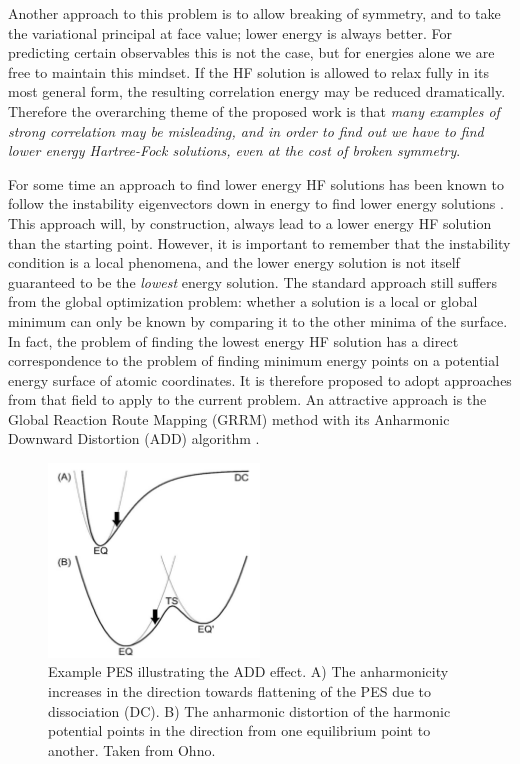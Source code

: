 \documentclass{revtex4}
\begin{document}
    Another approach to this problem is to allow breaking of symmetry, and to take the variational 
    principal at face value; lower 
    energy is 
    always better. For predicting certain observables this is not the case, but for energies alone 
    we are free 
    to maintain this mindset. If the HF solution is allowed to relax fully in its most general 
    form, the resulting correlation energy may be reduced dramatically. Therefore the overarching 
    theme of the proposed work is that 
    \emph{many 
    examples of strong correlation may be misleading, and in order to find out we have to find 
    lower 
    energy Hartree-Fock solutions, even at the cost of broken symmetry}.    
    
    For some time an approach to find lower energy HF solutions has been known to follow the 
    instability eigenvectors down in energy 
    to find lower energy solutions \cite{Seeger1977}. This approach will, by construction, always 
    lead to a lower energy HF solution than the starting point. However, it is important to 
    remember that the instability condition is a local phenomena, and the lower energy solution is 
    not itself guaranteed to be the \emph{lowest} energy solution. The standard approach still 
    suffers 
    from the global optimization problem: whether a solution is a local or global minimum can only 
    be known by comparing it to the other minima of the surface. In fact, the problem of finding 
    the lowest energy HF solution has a direct correspondence to the problem of finding minimum 
    energy points on a potential energy surface of atomic coordinates. It is therefore proposed to 
    adopt approaches from that field to apply to the current problem. An attractive approach is the 
    Global Reaction Route Mapping (GRRM) method with its Anharmonic Downward Distortion (ADD) 
    algorithm \cite{Ohno2006, Ohno2016}. 
    
    \begin{figure}
      \centering
      \includegraphics[width=0.5\textwidth]{../figures/ADD.png}
      \caption{Example PES illustrating the ADD effect. A) The anharmonicity increases in the 
      direction towards flattening of the PES due to dissociation (DC). B) The anharmonic 
      distortion of the 
      harmonic potential points in the direction from one equilibrium point to another. Taken from 
      Ohno\cite{Ohno2016}.}
      \label{add}
    \end{figure}
    
\end{document}
